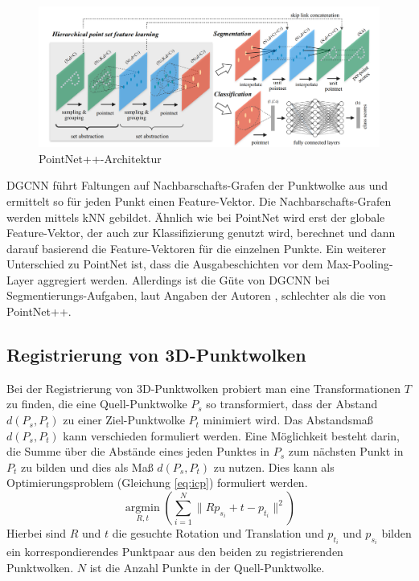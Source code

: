 \documentclass[12pt,titlepage, twoside]{article}
\begin{document}
\begin{figure}
    \centering
    \includegraphics[width=1.0\textwidth]{./Images/PointNetPPArchitektur.png}
    \caption{PointNet++-Architektur \cite{qi2017pointnet++}}
    \label{fig:point:net:pp:arch}
\end{figure}

DGCNN führt Faltungen auf Nachbarschafts-Grafen der Punktwolke aus und ermittelt so für jeden Punkt einen Feature-Vektor. Die Nachbarschafts-Grafen werden mittels kNN gebildet.
Ähnlich wie bei PointNet wird erst der globale Feature-Vektor, der auch zur Klassifizierung genutzt wird, berechnet und dann darauf basierend die Feature-Vektoren für die einzelnen Punkte.
Ein weiterer Unterschied zu PointNet ist, dass die Ausgabeschichten vor dem Max-Pooling-Layer aggregiert werden.
Allerdings ist die Güte von DGCNN bei Segmentierungs-Aufgaben, laut Angaben der Autoren \cite{dgcnn}, schlechter als die von PointNet++.

\subsection{Registrierung von 3D-Punktwolken}
\label{sec:stand:registrierung}

Bei der Registrierung von 3D-Punktwolken probiert man eine Transformationen $T$ zu finden, die eine Quell-Punktwolke $P_s$ so transformiert, dass der Abstand $d(P_s,P_t)$ zu einer Ziel-Punktwolke $P_t$ minimiert wird.
Das Abstandsmaß $d(P_s, P_t)$ kann verschieden formuliert werden. Eine Möglichkeit besteht darin, die Summe über die Abstände eines jeden Punktes in $P_s$ 
zum nächsten Punkt in $P_t$ zu bilden und dies als Maß $d(P_s, P_t)$ zu nutzen. 
Dies kann als Optimierungsproblem (Gleichung \ref{eq:icp}) formuliert werden.
\begin{equation}
    \label{eq:icp}
    \underset{R,t}{\operatorname{argmin}}(\sum_{i=1}^N{\|Rp_{s_i} + t - p_{t_i}\|^2})
\end{equation}
Hierbei sind $R$ und $t$ die gesuchte Rotation und Translation und $p_{t_i}$ und $p_{s_i}$ bilden ein korrespondierendes Punktpaar aus den beiden zu registrierenden Punktwolken. 
$N$ ist die Anzahl Punkte in der Quell-Punktwolke.
\end{document}
